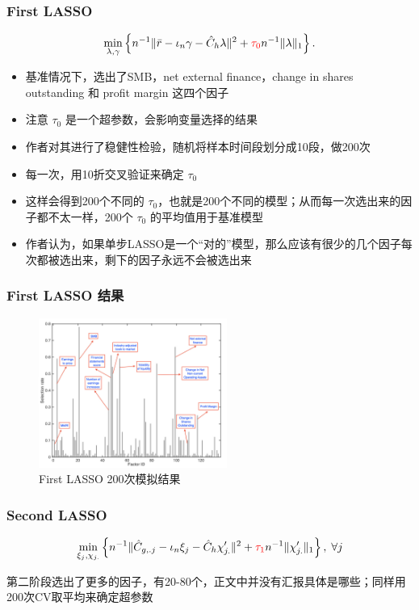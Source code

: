 \documentclass[
  UTF8,
  xcolor={dvipsnames,rgb},
  hyperref={colorlinks, citecolor=orange, linkcolor=black},
  aspectratio=169
  ]{beamer}
\begin{document}
\begin{frame}
    \frametitle{First LASSO}
    \[ \min_{\lambda,\gamma} \left\{ n^{-1} \Vert \bar{r}-\iota_{n}\gamma-\hat{C}_{h}\lambda \Vert^{2} + \textcolor{red}{\tau_{0}}n^{-1} \Vert \lambda \Vert_{1} \right\} .\]
    
    \begin{itemize}
        \item 基准情况下，选出了SMB，net external finance，change in shares outstanding 和 profit margin 这四个因子
        \item 注意 \(\tau_0\) 是一个超参数，会影响变量选择的结果
        \item 作者对其进行了稳健性检验，随机将样本时间段划分成10段，做200次
        \item 每一次，用10折交叉验证来确定 \(\tau_0\)
        \item 这样会得到200个不同的 \(\tau_0\)，也就是200个不同的模型；从而每一次选出来的因子都不太一样，200个 \(\tau_0\) 的平均值用于基准模型
        \item 作者认为，如果单步LASSO是一个``对的''模型，那么应该有很少的几个因子每次都被选出来，剩下的因子永远不会被选出来
    \end{itemize}

\end{frame}

\begin{frame}

    \frametitle{First LASSO 结果}
    \begin{figure}[H]
    \begin{center}
    \includegraphics[width=0.55\textwidth]{../assets/stage1.png}
    \end{center}
    \caption{First LASSO 200次模拟结果}
    \label{pic:2}
    \end{figure}


\end{frame}


\begin{frame}
    \frametitle{Second LASSO}
    \[\min_{\xi_{j},\chi_{j.}} \left\{ n^{-1}\lVert \hat{C}_{g,.j}-\iota_{n}\xi_{j}-\hat{C}_{h}\chi_{j.}' \rVert^{2} + \textcolor{red}{\tau_{1}}n^{-1}\lVert \chi_{j.}' \rVert_{1}  \right\} , \; \forall j\]

    \vspace{1em}
    第二阶段选出了更多的因子，有20-80个，正文中并没有汇报具体是哪些；同样用200次CV取平均来确定超参数


\end{frame}
\end{document}
